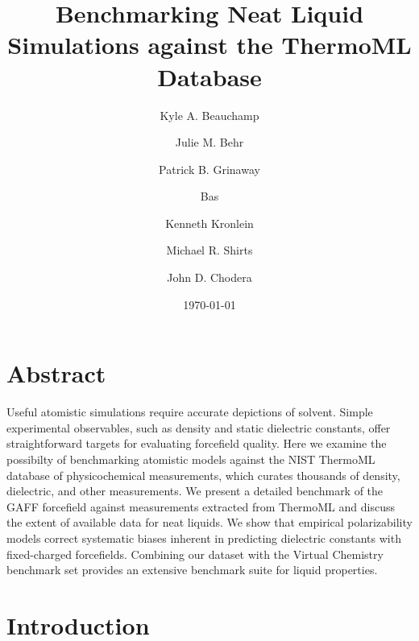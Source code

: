\documentclass[aps,pre,twocolumn,superscriptaddress]{revtex4-1}
\begin{document}
\title{Benchmarking Neat Liquid Simulations against the ThermoML Database}

 \author{Kyle A. Beauchamp}

 \author{Julie M. Behr}

\author{Patrick B. Grinaway }

\author{Bas}

 \author{Kenneth Kronlein}
 
 \author{Michael R. Shirts}

 \author{John D. Chodera}

 
\date{\today}
\maketitle


\section{Abstract}

Useful atomistic simulations require accurate depictions of solvent.  Simple experimental observables, such as density and static dielectric constants, offer straightforward targets for evaluating forcefield quality.  Here we examine the possibilty of benchmarking atomistic models against the NIST ThermoML database of physicochemical measurements, which curates thousands of density, dielectric, and other measurements.  We present a detailed benchmark of the GAFF forcefield against measurements extracted from ThermoML and discuss the extent of available data for neat liquids.  We show that empirical polarizability models correct systematic biases inherent in predicting dielectric constants with fixed-charged forcefields.  Combining our dataset with the Virtual Chemistry benchmark set provides an extensive benchmark suite for liquid properties.  

\section{Introduction}
\end{document}
